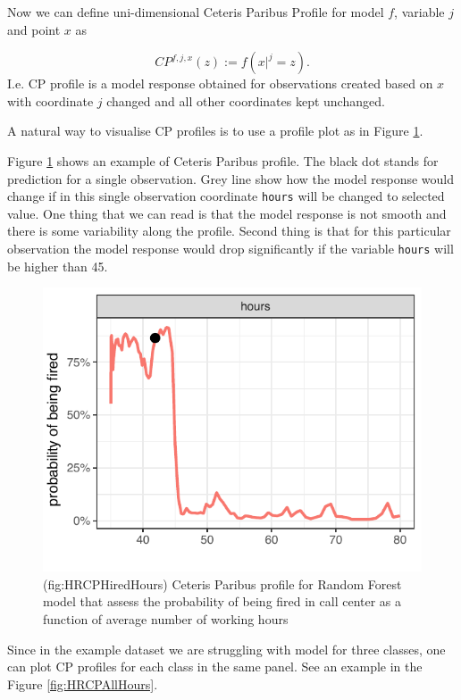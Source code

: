 \documentclass[]{krantz}
\theoremstyle{definition}
\theoremstyle{definition}
\theoremstyle{definition}
\theoremstyle{remark}
\begin{document}
Now we can define uni-dimensional Ceteris Paribus Profile for model
\(f\), variable \(j\) and point \(x\) as

\[
CP^{f, j, x}(z) := f(x|^j = z).
\] I.e. CP profile is a model response obtained for observations created
based on \(x\) with coordinate \(j\) changed and all other coordinates
kept unchanged.

A natural way to visualise CP profiles is to use a profile plot as in
Figure \ref{fig:HRCPFiredHours}.

Figure \ref{fig:HRCPFiredHours} shows an example of Ceteris Paribus
profile. The black dot stands for prediction for a single observation.
Grey line show how the model response would change if in this single
observation coordinate \texttt{hours} will be changed to selected value.
One thing that we can read is that the model response is not smooth and
there is some variability along the profile. Second thing is that for
this particular observation the model response would drop significantly
if the variable \texttt{hours} will be higher than 45.

\begin{figure}

{\centering \includegraphics[width=0.5\linewidth]{figure/HR_cp_fired_hours} 

}

\caption{(fig:HRCPHiredHours) Ceteris Paribus profile for Random Forest model that assess the probability of being fired in call center as a function of average number of working hours}\label{fig:HRCPFiredHours}
\end{figure}

Since in the example dataset we are struggling with model for three
classes, one can plot CP profiles for each class in the same panel. See
an example in the Figure \ref{fig:HRCPAllHours}.
\end{document}
